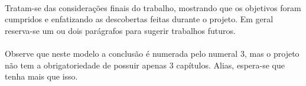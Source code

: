\paragraph{}Tratam-se das considerações finais do trabalho, mostrando que os objetivos foram cumpridos e enfatizando as descobertas feitas durante o projeto. Em geral reserva-se um ou dois parágrafos para sugerir trabalhos futuros.

\paragraph{}Observe que neste modelo a conclusão é numerada pelo numeral 3, mas o projeto não tem a obrigatoriedade de possuir apenas 3 capítulos. Alias, espera-se que tenha mais que isso.

